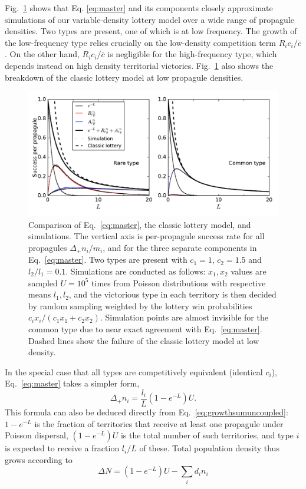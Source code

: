 \documentclass[12pt]{article}
\begin{document}
Fig.~\ref{fig:simcomp} shows that Eq. \eqref{eq:master} and its components closely approximate simulations of our variable-density lottery model over a wide range of propagule densities.  Two types are present, one of which is at low frequency. The growth of the low-frequency type relies crucially on the low-density competition term $R_i c_i/\overline{c}$. On the other hand, $R_i c_i/\overline{c}$ is negligible for the high-frequency type, which depends instead on high density territorial victories. Fig.~\ref{fig:simcomp} also shows the breakdown of the classic lottery model at low propagule densities.

\begin{figure}
\centering
\includegraphics[scale=0.8]{simulationcomparison.pdf}
\caption{\label{fig:simcomp} Comparison of Eq.~\eqref{eq:master}, the classic lottery model, and simulations. The vertical axis is per-propagule success rate for all propagules $\Delta_+ n_i/m_i$, and for the three separate components in Eq.~\eqref{eq:master}. Two types are present with $c_1=1$, $c_2=1.5$ and $l_2/l_1=0.1$. Simulations are conducted as follows: $x_1,x_2$ values are sampled $U=10^5$ times from Poisson distributions with respective means $l_1,l_2$, and the victorious type in each territory is then decided by random sampling weighted by the lottery win probabilities $c_ix_i/(c_1 x_1 + c_2 x_2)$.  Simulation points are almost invisible for the common type due to near exact agreement with Eq.~\eqref{eq:master}. Dashed lines show the failure of the classic lottery model at low density.} 
\end{figure}

In the special case that all types are competitively equivalent (identical $c_i$), Eq.~\eqref{eq:master} takes a simpler form,
\begin{equation}
\Delta_+ n_i = \frac{l_i}{L}(1-e^{-L})U. \label{eq:masterequalc}
\end{equation}
This formula can also be deduced directly from Eq.~\eqref{eq:growthsumuncoupled}: $1-e^{-L}$ is the fraction of territories that receive at least one propagule under Poisson dispersal, $(1-e^{-L})U$ is the total number of such territories, and type $i$ is expected to receive a fraction $l_i/L$ of these. Total population density thus grows according to
\begin{equation}
\Delta N=(1-e^{-L})U-\sum_i d_i n_i \label{eq:Nmaster}
\end{equation}
\end{document}
